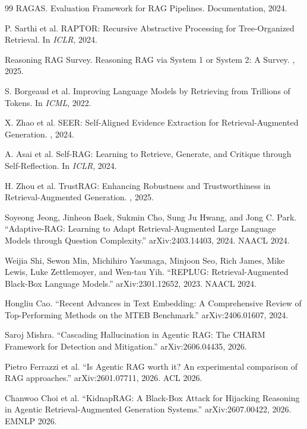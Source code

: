 \documentclass[11pt]{book}
\begin{document}
\begin{thebibliography}{99}
RAGAS.
\newblock Evaluation Framework for RAG Pipelines.
\newblock Documentation, 2024.

P. Sarthi et al.
\newblock RAPTOR: Recursive Abstractive Processing for Tree-Organized Retrieval.
\newblock In {\em ICLR}, 2024.

Reasoning RAG Survey.
\newblock Reasoning RAG via System 1 or System 2: A Survey.
, 2025.

S. Borgeaud et al.
\newblock Improving Language Models by Retrieving from Trillions of Tokens.
\newblock In {\em ICML}, 2022.

X. Zhao et al.
\newblock SEER: Self-Aligned Evidence Extraction for Retrieval-Augmented Generation.
, 2024.

A. Asai et al.
\newblock Self-RAG: Learning to Retrieve, Generate, and Critique through Self-Reflection.
\newblock In {\em ICLR}, 2024.

H. Zhou et al.
\newblock TrustRAG: Enhancing Robustness and Trustworthiness in Retrieval-Augmented Generation.
, 2025.

Soyeong Jeong, Jinheon Baek, Sukmin Cho, Sung Ju Hwang, and Jong C. Park.
``Adaptive-RAG: Learning to Adapt Retrieval-Augmented Large Language Models
through Question Complexity.''
arXiv:2403.14403, 2024. NAACL 2024.

Weijia Shi, Sewon Min, Michihiro Yasunaga, Minjoon Seo, Rich James,
Mike Lewis, Luke Zettlemoyer, and Wen-tau Yih.
``REPLUG: Retrieval-Augmented Black-Box Language Models.''
arXiv:2301.12652, 2023. NAACL 2024.

Hongliu Cao.
``Recent Advances in Text Embedding: A Comprehensive Review of Top-Performing
Methods on the MTEB Benchmark.''
arXiv:2406.01607, 2024.

Saroj Mishra.
``Cascading Hallucination in Agentic RAG: The CHARM Framework for Detection and Mitigation.''
arXiv:2606.04435, 2026.

Pietro Ferrazzi et al.
``Is Agentic RAG worth it? An experimental comparison of RAG approaches.''
arXiv:2601.07711, 2026. ACL 2026.

Chanwoo Choi et al.
``KidnapRAG: A Black-Box Attack for Hijacking Reasoning in Agentic Retrieval-Augmented Generation Systems.''
arXiv:2607.00422, 2026. EMNLP 2026.


\end{thebibliography}
\end{document}
